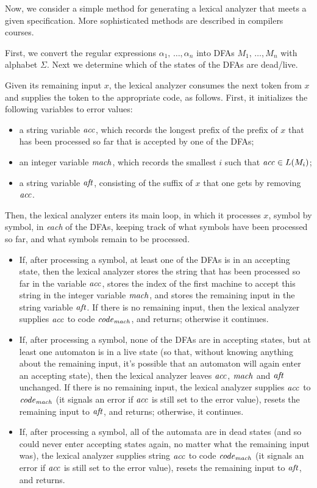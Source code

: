 Now, we consider a simple method for generating a lexical analyzer
that meets a given specification.  More sophisticated methods are
described in compilers courses.

First, we convert the regular expressions $\alpha_1,\,\ldots,\alpha_n$
into DFAs $M_1,\,\ldots,M_n$ with alphabet $\Sigma$.  Next we
determine which of the states of the DFAs are dead/live.

Given its remaining input $x$, the lexical analyzer consumes the next
token from $x$ and supplies the token to the appropriate code, as
follows.  First, it initializes the following variables to error
values:
\begin{itemize}
\item a string variable $\mathit{acc}$, which records the longest prefix of
  the prefix of $x$ that has been processed so far that is accepted by
  one of the DFAs;

\item an integer variable $\mathit{mach}$, which records the smallest $i$ such
  that $\mathit{acc}\in L(M_i)$;

\item a string variable $\mathit{aft}$, consisting of the suffix of $x$ that
  one gets by removing $\mathit{acc}$.
\end{itemize}

Then, the lexical analyzer enters its main loop, in which it processes
$x$, symbol by symbol, in \emph{each} of the DFAs, keeping track of
what symbols have been processed so far, and what symbols remain to be
processed.
\begin{itemize}
\item If, after processing a symbol, at least one of the DFAs is in an
  accepting state, then the lexical analyzer stores the string that
  has been processed so far in the variable $\mathit{acc}$, stores the index
  of the first machine to accept this string in the integer variable
  $\mathit{mach}$, and stores the remaining input in the string variable
  $\mathit{aft}$.  If there is no remaining input, then the lexical analyzer
  supplies $\mathit{acc}$ to code ${\it code}_{\mathit{mach}}$, and returns; otherwise it
  continues.

\item If, after processing a symbol, none of the DFAs are in accepting
  states, but at least one automaton is in a live state (so that,
  without knowing anything about the remaining input, it's possible
  that an automaton will again enter an accepting state), then the
  lexical analyzer leaves $\mathit{acc}$, $\mathit{mach}$ and $\mathit{aft}$ unchanged.  If
  there is no remaining input, the lexical analyzer supplies $\mathit{acc}$ to
  ${\it code}_{\mathit{mach}}$ (it signals an error if $\mathit{acc}$ is still set to the
  error value), resets the remaining input to $\mathit{aft}$, and returns;
  otherwise, it continues.

\item If, after processing a symbol, all of the automata are in dead
  states (and so could never enter accepting states again, no matter
  what the remaining input was), the lexical analyzer supplies string
  $\mathit{acc}$ to code ${\it code}_{\mathit{mach}}$ (it signals an error if $\mathit{acc}$ is still
  set to the error value), resets the remaining input to $\mathit{aft}$, and
  returns.
\end{itemize}

